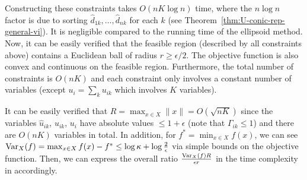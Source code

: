 Constructing these constraints takes $O(nK\log n)$ time, where the $n\log n$ factor is due to sorting $\hat{d}_{1k}, \dots, \hat{d}_{nk}$ for each $k$ (see Theorem~\ref{thm:U-conic-rep-general-vi}). It is negligible compared to the running time of the ellipsoid method. 
Now, it can be easily verified that the feasible region (described by all constraints above) contains a Euclidean ball of radius $r \geq \epsilon/2$. The objective function is also convex and continuous on the feasible region. Furthermore, the total number of constraints is $O(nK)$ and each constraint only involves a constant number of variables (except $u_i = \sum_k u_{ik}$ which involves $K$ variables).

It can be easily verified that $R = \max_{x\in X} \|x\| = O(\sqrt{nK})$ since the variables $\hat{u}_{ik}$, $u_{ik}$, $u_i$ have absolute values $\leq 1+\epsilon$ (note that $\Gamma_{ik}\leq 1$) and there are $O(nK)$ variables in total. In addition, for $f^* = \min_{x\in X} f(x)$, we can see ${\rm Var}_X(f) = \max_{x\in X}f(x) - f^* \leq \log \kappa + \log \frac{2}{\epsilon}$ via simple bounds on the objective function.
Then, we can express the overall ratio $\frac{{\rm Var}_X(f) R}{\epsilon r}$ in the time complexity in \cite[4.1.2]{ben2019lectures} accordingly.



